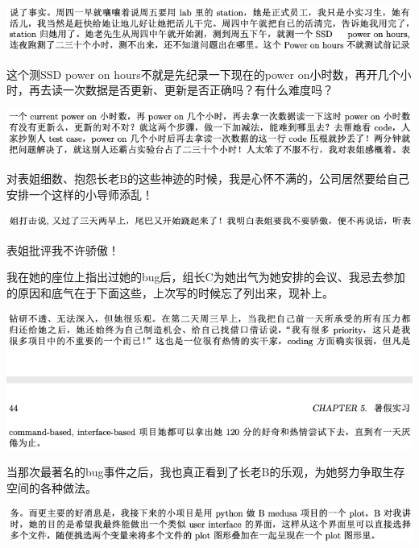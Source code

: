 \documentclass[9pt, b5paper]{article}
\begin{document}
\begin{center}
\includegraphics[width=.9\linewidth]{./pic/backups_plans_20210508_110710.png}
\end{center}

这个测SSD power on hours不就是先纪录一下现在的power on小时数，再开几个小时，再去读一次数据是否更新、更新是否正确吗？有什么难度吗？

\begin{center}
\includegraphics[width=.9\linewidth]{./pic/backups_plans_20210508_110904.png}
\end{center}

对表姐细数、抱怨长老B的这些神迹的时候，我是心怀不满的，公司居然要给自己安排一个这样的小导师添乱！

\begin{center}
\includegraphics[width=.9\linewidth]{./pic/backups_plans_20210508_111030.png}
\end{center}

表姐批评我不许骄傲！

我在她的座位上指出过她的bug后，组长C为她出气为她安排的会议、我忌去参加的原因和底气在于下面这些，上次写的时候忘了列出来，现补上。 

\begin{center}
\includegraphics[width=.9\linewidth]{./pic/backups_plans_、.png}
\end{center}

当那次最著名的bug事件之后，我也真正看到了长老B的乐观，为她努力争取生存空间的各种做法。 

\begin{center}
\includegraphics[width=.9\linewidth]{./pic/backups_plans_20210508_113251.png}
\end{center}
\end{document}
